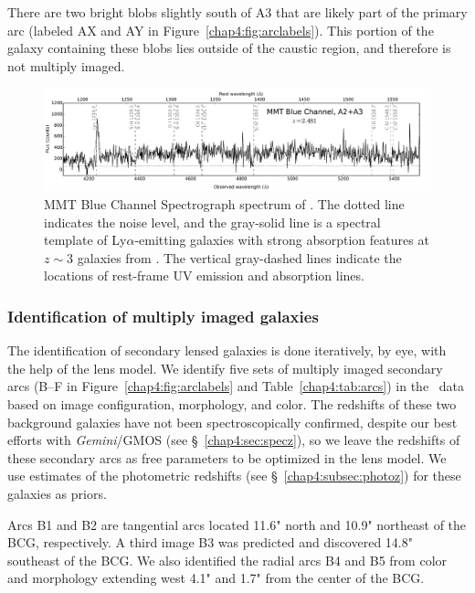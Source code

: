 There are two bright blobs slightly south of A3 that are likely part of the primary arc (labeled AX and AY in Figure~\ref{chap4:fig:arclabels}). This portion of the galaxy containing these blobs lies outside of the caustic region, and therefore is not multiply imaged.

\begin{figure}
\includegraphics[width=\textwidth]{Chap4/c4f4.pdf}
\caption[MMT Blue Channel Spectrograph spectrum of \giantarc]{MMT Blue Channel Spectrograph spectrum of \giantarc. The dotted line indicates the noise level, and the gray-solid line is a spectral template of Ly$\alpha$-emitting galaxies with strong absorption features at $z\sim3$ galaxies from \citet{Shapley:2003fk}. The vertical gray-dashed lines indicate the locations of rest-frame UV emission and absorption lines.}
\label{chap4:fig:MMTspectrum}
\end{figure}

\subsubsection{Identification of multiply imaged galaxies}
\label{chap4:subsec:sec_arcs}
The identification of secondary lensed galaxies is done iteratively, by eye, with the help of the lens model. We identify five sets of multiply imaged secondary arcs (B--F in Figure~\ref{chap4:fig:arclabels} and Table~\ref{chap4:tab:arcs}) in the \hst\ data based on image configuration, morphology, and color. The redshifts of these two background galaxies have not been spectroscopically confirmed, despite our best efforts with \textit{Gemini}/GMOS (see \S~\ref{chap4:sec:specz}), so we leave the redshifts of these secondary arcs as free parameters to be optimized in the lens model. We use estimates of the photometric redshifts (see \S~\ref{chap4:subsec:photoz}) for these galaxies as priors.

Arcs B1 and B2 are tangential arcs located 11.6" north and 10.9" northeast of the BCG, respectively. A third image B3 was predicted and discovered 14.8" southeast of the BCG. We also identified the radial arcs B4 and B5 from color and morphology extending west 4.1" and 1.7" from the center of the BCG.


